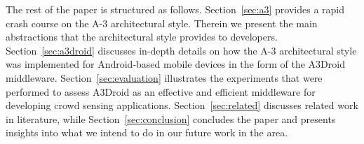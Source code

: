 The rest of the paper is structured as follows. Section~\ref{sec:a3} provides a rapid crash course on the A-3 architectural style. Therein we present the main abstractions that the architectural style provides to developers. Section~\ref{sec:a3droid} discusses in-depth details on how the A-3 architectural style was implemented for Android-based mobile devices in the form of the A3Droid middleware. Section~\ref{sec:evaluation} illustrates the experiments that were performed to assess A3Droid as an effective and efficient middleware for developing crowd sensing applications. Section~\ref{sec:related} discusses related work in literature, while Section~\ref{sec:conclusion} concludes the paper and presents insights into what we intend to do in our future work in the area.











